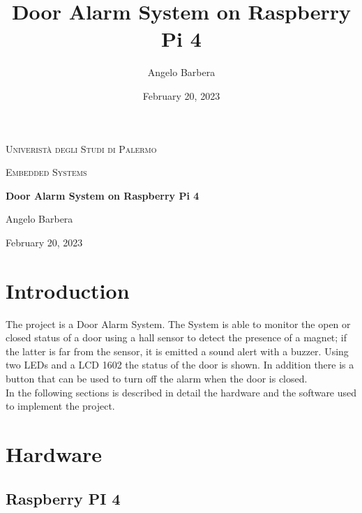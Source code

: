 \documentclass[]{article}
\title{\huge Door Alarm System on Raspberry Pi 4}
\author{Angelo Barbera}
\date{February 20, 2023}
\begin{document}
\begin{titlepage}
	\centering
	{\scshape\LARGE Univeristà degli Studi di Palermo \par}
	\vspace{0.6cm}
	{\scshape\Large Embedded Systems \par}
	\vspace{1.8cm}
	{\huge\bfseries Door Alarm System on Raspberry Pi 4 \par}
	\vspace{2cm}
	\vfill
	{\large Angelo Barbera\par}
    \vspace{0.2cm}
    {\large February 20, 2023\par}
\end{titlepage}


\tableofcontents

\clearpage
{}


\section{Introduction}
The project is a Door Alarm System. The System is able to monitor the open or closed status of a door using a hall sensor
to detect the presence of a magnet; if the latter is far from the sensor, it is emitted a sound alert with a buzzer. 
Using two LEDs and a LCD 1602 the status of the door is shown. In addition there is a button that can be used to 
turn off the alarm when the door is closed.
\\ 
In the following sections is described in detail the hardware and the software used to implement the project.

\section{Hardware}

\subsection{Raspberry PI 4}
\end{document}
